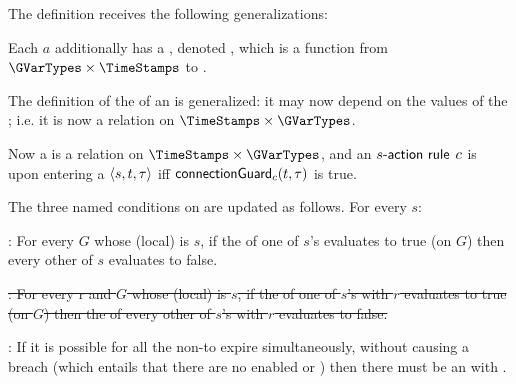 \documentclass[12pt]{article}
\begin{document}

 The \Event definition receives the following generalizations:
\begin{LPPI}
\item Each \Action $a$ additionally has a \gvTransform, denoted , which is a function from
$\GVarTypes \times \TimeStamps$ to \GVarTypes.
\item The definition of the \TGuard of an  is generalized: it may now depend on the values of the \GVars; i.e. it is now a relation on $\TimeStamps \times \GVarTypes$.
\end{LPPI}

Now a \TGuard is a relation on $\TimeStamps \times \GVarTypes$, and an $s\textsf{-{action rule}}$ $c$ is  upon entering a \GlobalState $\langle s,t,\tau\rangle$ iff $\textsf{connectionGuard}_{c}(t,\tau)$ is true.


The three named conditions on \TGuards are updated as follows. For every \State $s$:
\medskip

\noindent {}: For every \GlobalState $G$ whose (local) \State is $s$, if the \TGuard of one of $s$'s \mustnarules evaluates to true (on $G$) then every other \TGuard of $s$ evaluates to false. 
\medskip

\noindent \sout{: For every \Role r and \GlobalState $G$ whose (local) \State is $s$, if the \TGuard of one of $s$'s \rmustnarules with \Role $r$ evaluates to true (on $G$) then the \TGuard of every other of $s$'s \rmustnarules with \Role $r$ evaluates to false.}
\medskip

\noindent {}: If it is possible for all the \enabled non-\Env \actionrules to expire simultaneously, without causing a breach (which entails that there are no enabled \mustnarules or \rmustnarules) then there must be an \depTrans{\Env} with \Deadline \nodeadline.


\end{document}
